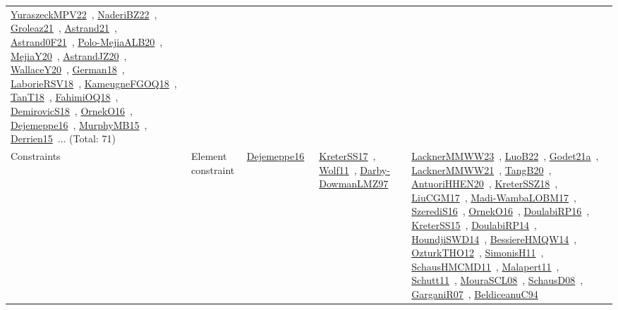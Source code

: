 {\begin{longtable}{lp{3cm}>{\raggedright\arraybackslash}p{6cm}>{\raggedright\arraybackslash}p{6cm}>{\raggedright\arraybackslash}p{8cm}}
\href{../works/YuraszeckMPV22.pdf}{YuraszeckMPV22}~\cite{YuraszeckMPV22}, \href{../works/NaderiBZ22.pdf}{NaderiBZ22}~\cite{NaderiBZ22}, \href{../works/Groleaz21.pdf}{Groleaz21}~\cite{Groleaz21}, \href{../works/Astrand21.pdf}{Astrand21}~\cite{Astrand21}, \href{../works/Astrand0F21.pdf}{Astrand0F21}~\cite{Astrand0F21}, \href{../works/Polo-MejiaALB20.pdf}{Polo-MejiaALB20}~\cite{Polo-MejiaALB20}, \href{../works/MejiaY20.pdf}{MejiaY20}~\cite{MejiaY20}, \href{../works/AstrandJZ20.pdf}{AstrandJZ20}~\cite{AstrandJZ20}, \href{../works/WallaceY20.pdf}{WallaceY20}~\cite{WallaceY20}, \href{../works/German18.pdf}{German18}~\cite{German18}, \href{../works/LaborieRSV18.pdf}{LaborieRSV18}~\cite{LaborieRSV18}, \href{../works/KameugneFGOQ18.pdf}{KameugneFGOQ18}~\cite{KameugneFGOQ18}, \href{../works/TanT18.pdf}{TanT18}~\cite{TanT18}, \href{../works/FahimiOQ18.pdf}{FahimiOQ18}~\cite{FahimiOQ18}, \href{../works/DemirovicS18.pdf}{DemirovicS18}~\cite{DemirovicS18}, \href{../works/OrnekO16.pdf}{OrnekO16}~\cite{OrnekO16}, \href{../works/Dejemeppe16.pdf}{Dejemeppe16}~\cite{Dejemeppe16}, \href{../works/MurphyMB15.pdf}{MurphyMB15}~\cite{MurphyMB15}, \href{../works/Derrien15.pdf}{Derrien15}~\cite{Derrien15}... (Total: 71)\\
Constraints & Element constraint & \href{../works/Dejemeppe16.pdf}{Dejemeppe16}~\cite{Dejemeppe16} & \href{../works/KreterSS17.pdf}{KreterSS17}~\cite{KreterSS17}, \href{../works/Wolf11.pdf}{Wolf11}~\cite{Wolf11}, \href{../works/Darby-DowmanLMZ97.pdf}{Darby-DowmanLMZ97}~\cite{Darby-DowmanLMZ97} & \href{../works/LacknerMMWW23.pdf}{LacknerMMWW23}~\cite{LacknerMMWW23}, \href{../works/LuoB22.pdf}{LuoB22}~\cite{LuoB22}, \href{../works/Godet21a.pdf}{Godet21a}~\cite{Godet21a}, \href{../works/LacknerMMWW21.pdf}{LacknerMMWW21}~\cite{LacknerMMWW21}, \href{../works/TangB20.pdf}{TangB20}~\cite{TangB20}, \href{../works/AntuoriHHEN20.pdf}{AntuoriHHEN20}~\cite{AntuoriHHEN20}, \href{../works/KreterSSZ18.pdf}{KreterSSZ18}~\cite{KreterSSZ18}, \href{../works/LiuCGM17.pdf}{LiuCGM17}~\cite{LiuCGM17}, \href{../works/Madi-WambaLOBM17.pdf}{Madi-WambaLOBM17}~\cite{Madi-WambaLOBM17}, \href{../works/SzerediS16.pdf}{SzerediS16}~\cite{SzerediS16}, \href{../works/OrnekO16.pdf}{OrnekO16}~\cite{OrnekO16}, \href{../works/DoulabiRP16.pdf}{DoulabiRP16}~\cite{DoulabiRP16}, \href{../works/KreterSS15.pdf}{KreterSS15}~\cite{KreterSS15}, \href{../works/DoulabiRP14.pdf}{DoulabiRP14}~\cite{DoulabiRP14}, \href{../works/HoundjiSWD14.pdf}{HoundjiSWD14}~\cite{HoundjiSWD14}, \href{../works/BessiereHMQW14.pdf}{BessiereHMQW14}~\cite{BessiereHMQW14}, \href{../works/OzturkTHO12.pdf}{OzturkTHO12}~\cite{OzturkTHO12}, \href{../works/SimonisH11.pdf}{SimonisH11}~\cite{SimonisH11}, \href{../works/SchausHMCMD11.pdf}{SchausHMCMD11}~\cite{SchausHMCMD11}, \href{../works/Malapert11.pdf}{Malapert11}~\cite{Malapert11}, \href{../works/Schutt11.pdf}{Schutt11}~\cite{Schutt11}, \href{../works/MouraSCL08.pdf}{MouraSCL08}~\cite{MouraSCL08}, \href{../works/SchausD08.pdf}{SchausD08}~\cite{SchausD08}, \href{../works/GarganiR07.pdf}{GarganiR07}~\cite{GarganiR07}, \href{../works/BeldiceanuC94.pdf}{BeldiceanuC94}~\cite{BeldiceanuC94}\\

\end{longtable}}
